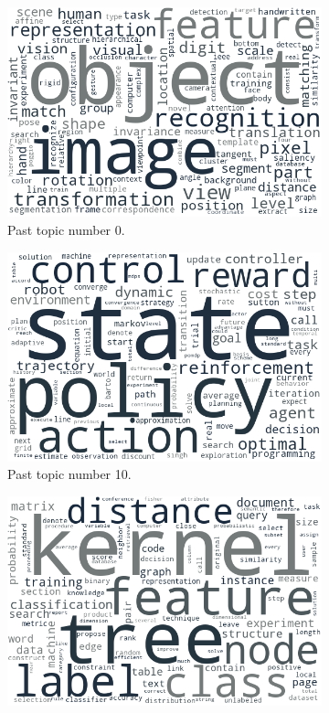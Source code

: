 \begin{figure}[h!]
	\begin{subfigure}{0.49\textwidth}
		\includegraphics[width=\linewidth]{01.Chapters/05.Results/past_00}
		\caption{Past topic number 0.}
	\end{subfigure}%
	\hfill
	\begin{subfigure}{0.49\textwidth}
		\includegraphics[width=\linewidth]{01.Chapters/05.Results/past_10}
		\caption{Past topic number 10.}
	\end{subfigure}%
	\vfill
	\begin{subfigure}{0.49\textwidth}
		\includegraphics[width=\linewidth]{01.Chapters/05.Results/past_16}

\end{subfigure}
\end{figure}
